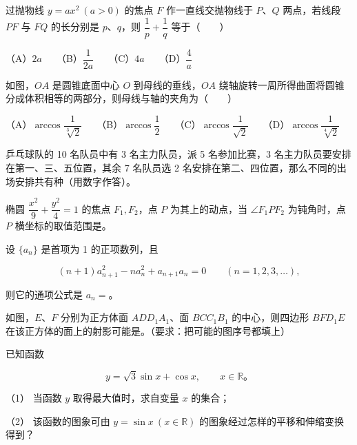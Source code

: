 \begin{question}
过抛物线 $y=ax^2\ (a>0)$ 的焦点 $F$ 作一直线交抛物线于 $P$、$Q$ 两点，若线段 $PF$ 与 $FQ$ 的长分别是 $p$、$q$，则 $\dfrac1p+\dfrac1q$ 等于\mbox{（　　）}

（A）$2a$　　（B）$\dfrac1{2a}$　　（C）$4a$　　（D）$\dfrac4a$

\Needspace{0.4\textheight}
\end{question}
\begin{question}
如图，$OA$ 是圆锥底面中心 $O$ 到母线的垂线，$OA$ 绕轴旋转一周所得曲面将圆锥分成体积相等的两部分，则母线与轴的夹角为\mbox{（　　）}
\nopagebreak[4]
\begin{center}\end{center}
\nopagebreak[4]
（A）$\arccos\dfrac1{\sqrt[3]{2}}$　　（B）$\arccos\dfrac12$　　（C）$\arccos\dfrac1{\sqrt2}$　　（D）$\arccos\dfrac1{\sqrt[4]{2}}$

\end{question}

\begin{question}
乒乓球队的 10 名队员中有 3 名主力队员，派 5 名参加比赛，3 名主力队员要安排在第一、三、五位置，其余 7 名队员选 2 名安排在第二、四位置，那么不同的出场安排共有\gkblank{}种（用数字作答）。

\end{question}
\begin{question}
椭圆 $\dfrac{x^2}{9}+\dfrac{y^2}{4}=1$ 的焦点 $F_1,F_2$，点 $P$ 为其上的动点，当 $\angle F_1PF_2$ 为钝角时，点 $P$ 横坐标的取值范围是\gkblank{}。

\end{question}
\begin{question}
设 $\{a_n\}$ 是首项为 1 的正项数列，且

\nopagebreak[4]
\[
(n+1)a_{n+1}^2-na_n^2+a_{n+1}a_n=0
\qquad(n=1,2,3,\ldots),
\]

则它的通项公式是 $a_n=$\gkblank{}。

\Needspace{0.4\textheight}
\end{question}
\begin{question}
如图，$E$、$F$ 分别为正方体面 $ADD_1A_1$、面 $BCC_1B_1$ 的中心，则四边形 $BFD_1E$ 在该正方体的面上的射影可能是\gkblank{}。（要求：把可能的图序号都填上）
\nopagebreak[4]
\begin{center}\end{center}
\nopagebreak[4]
\end{question}
\begin{question}
已知函数

\nopagebreak[4]
\[
y=\sqrt3\sin x+\cos x,\qquad x\in\mathbb R\text{。}
\]

（1） 当函数 $y$ 取得最大值时，求自变量 $x$ 的集合；

（2） 该函数的图象可由 $y=\sin x\ (x\in\mathbb R)$ 的图象经过怎样的平移和伸缩变换得到？

\end{question}

